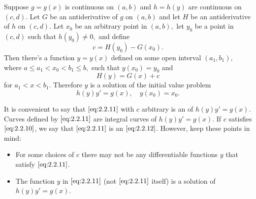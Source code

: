\documentclass{ximera}
\begin{document}
\begin{theorem}\label{thmtype:2.2.1}
Suppose $g=g(x)$ is continuous on $(a,b)$ and $h=h(y)$
are continuous on $(c,d)$. Let $G$ be an antiderivative of
$g$ on $(a,b)$ and let $H$ be an antiderivative of $h$ on $(c,d).$
Let $x_0$ be an arbitrary point in $(a,b),$ let $y_0$
be a point in $(c,d)$ such that $h(y_0)\neq 0,$ and define
\begin{equation} \label{eq:2.2.10}
c=H(y_0)-G(x_0).
\end{equation}
Then there's a function $y=y(x)$ defined on some open interval
$(a_1,b_1),$ where $a\leq a_1<x_0<b_1\leq b,$ such that  $y(x_0)=y_0$
and
\begin{equation} \label{eq:2.2.11}
H(y)=G(x)+c
\end{equation}
for $a_1<x<b_1$.
Therefore $y$ is a solution of the initial value problem
\begin{equation} \label{eq:2.2.12}
h(y)y'=g(x),\quad y(x_0)=x_0.
\end{equation}
\end{theorem}
 
 
It is convenient to say that $\eqref{eq:2.2.11}$ with $c$ arbitrary is an
 of $h(y)y'=g(x)$. Curves defined by
$\eqref{eq:2.2.11}$ are integral curves of $h(y)y'=g(x)$. If $c$ satisfies
$\eqref{eq:2.2.10}$, we say that $\eqref{eq:2.2.11}$ is an  $\eqref{eq:2.2.12}$. However, keep these points in mind:
\begin{itemize}
\item  For some choices of $c$ there may not be any differentiable
functions $y$ that satisfy $\eqref{eq:2.2.11}$.
\item  The function $y$ in $\eqref{eq:2.2.11}$ (not $\eqref{eq:2.2.11}$ itself)
is a solution of $h(y)y'=g(x)$.
\end{itemize}
 
\end{document}
